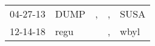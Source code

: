 \begin{supertabular}{p{0.07\textwidth}p{0.06\textwidth}p{0.02\textwidth}p{0.02\textwidth}p{0.06\textwidth}}
 04-27-13\textsuperscript{} &  DUMP\textsuperscript{} &  , &  , &  SUSA\textsuperscript{} \\
 12-14-18\textsuperscript{} &  regu\textsuperscript{} &    &  , &  wbyl\textsuperscript{} \\
\end{supertabular}
